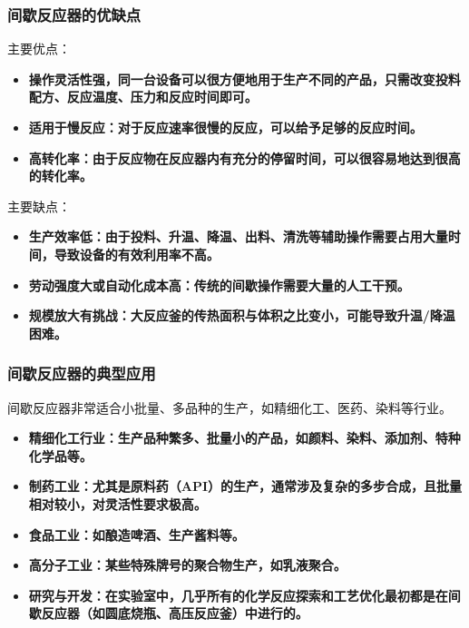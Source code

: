 \documentclass[dvipsnames, svgnames, x11names]{beamer}
\begin{document}
\begin{frame}
    \frametitle{间歇反应器的优缺点}
    \begin{minipage}{0.48\linewidth}
        主要优点：
        \begin{itemize}
          \item \bf{操作灵活性强}，同一台设备可以很方便地用于生产不同的产品，只需改变投料配方、反应温度、压力和反应时间即可。
          \item \bf{适用于慢反应}：对于反应速率很慢的反应，可以给予足够的反应时间。
          \item \bf{高转化率}：由于反应物在反应器内有充分的停留时间，可以很容易地达到很高的转化率。
        \end{itemize}
    \end{minipage}\hfill
    \begin{minipage}{0.48\linewidth}
        主要缺点：
        \begin{itemize}
          \item \bf{生产效率低}：由于投料、升温、降温、出料、清洗等辅助操作需要占用大量时间，导致设备的有效利用率不高。
          \item \bf{劳动强度大或自动化成本高}：传统的间歇操作需要大量的人工干预。
          \item \bf{规模放大有挑战}：大反应釜的传热面积与体积之比变小，可能导致升温/降温困难。
        \end{itemize}
    \end{minipage}
\end{frame}


\begin{frame}
    \frametitle{间歇反应器的典型应用}
    间歇反应器非常适合小批量、多品种的生产，如精细化工、医药、染料等行业。
    \begin{itemize}
      \item \bf{精细化工行业：}生产品种繁多、批量小的产品，如颜料、染料、添加剂、特种化学品等。
      \item \bf{制药工业：}尤其是原料药（API）的生产，通常涉及复杂的多步合成，且批量相对较小，对灵活性要求极高。
      \item \bf{食品工业：}如酿造啤酒、生产酱料等。
      \item \bf{高分子工业：}某些特殊牌号的聚合物生产，如乳液聚合。
      \item \bf{研究与开发：}在实验室中，几乎所有的化学反应探索和工艺优化最初都是在间歇反应器（如圆底烧瓶、高压反应釜）中进行的。
    \end{itemize}
\end{frame}
\end{document}
